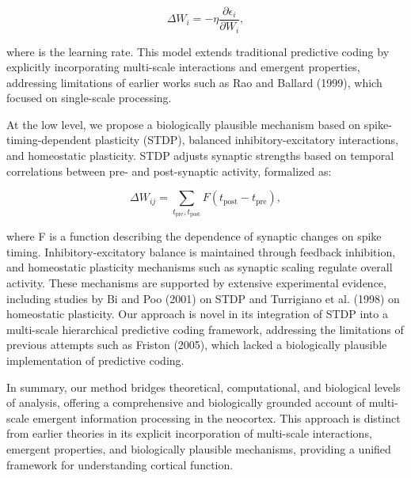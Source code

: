 \documentclass{article}
\begin{document}
\begin{equation}
\Delta W_i = -\eta \frac{\partial \epsilon_i}{\partial W_i},
\end{equation}

where \eta is the learning rate. This model extends traditional predictive coding by explicitly incorporating multi-scale interactions and emergent properties, addressing limitations of earlier works such as Rao and Ballard (1999), which focused on single-scale processing.

At the low level, we propose a biologically plausible mechanism based on spike-timing-dependent plasticity (STDP), balanced inhibitory-excitatory interactions, and homeostatic plasticity. STDP adjusts synaptic strengths based on temporal correlations between pre- and post-synaptic activity, formalized as:

\begin{equation}
\Delta W_{ij} = \sum_{t_{\text{pre}}, t_{\text{post}}} F(t_{\text{post}} - t_{\text{pre}}),
\end{equation}

where F is a function describing the dependence of synaptic changes on spike timing. Inhibitory-excitatory balance is maintained through feedback inhibition, and homeostatic plasticity mechanisms such as synaptic scaling regulate overall activity. These mechanisms are supported by extensive experimental evidence, including studies by Bi and Poo (2001) on STDP and Turrigiano et al. (1998) on homeostatic plasticity. Our approach is novel in its integration of STDP into a multi-scale hierarchical predictive coding framework, addressing the limitations of previous attempts such as Friston (2005), which lacked a biologically plausible implementation of predictive coding.

In summary, our method bridges theoretical, computational, and biological levels of analysis, offering a comprehensive and biologically grounded account of multi-scale emergent information processing in the neocortex. This approach is distinct from earlier theories in its explicit incorporation of multi-scale interactions, emergent properties, and biologically plausible mechanisms, providing a unified framework for understanding cortical function.
\end{document}
